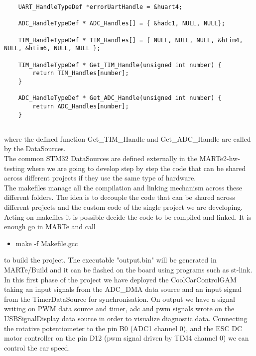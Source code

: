 \begin{lstlisting}
   	UART_HandleTypeDef *errorUartHandle = &huart4;
   	
   	ADC_HandleTypeDef * ADC_Handles[] = { &hadc1, NULL, NULL};
   	
   	TIM_HandleTypeDef * TIM_Handles[] = { NULL, NULL, NULL, &htim4, NULL, &htim6, NULL, NULL };
   	
   	TIM_HandleTypeDef * Get_TIM_Handle(unsigned int number) {
   		return TIM_Handles[number];
   	}
   	
   	ADC_HandleTypeDef * Get_ADC_Handle(unsigned int number) {
   		return ADC_Handles[number];
   	}
   	
\end{lstlisting}
where the defined function Get\_TIM\_Handle and Get\_ADC\_Handle are called by the DataSources.\\
The common STM32 DataSources are defined externally in the MARTe2-hw-testing where we are going to develop step by step the code that can be shared across different projects if they use the same type of hardware.\\
The makefiles manage all the compilation and linking mechanism across these different folders. The idea is to decouple the code that can be shared across different projects and the custom code of the single project we are developing. Acting on makefiles it is possible decide the code to be compiled and linked. It is enough go in MARTe and call
\begin{itemize}
\item make -f Makefile.gcc
\end{itemize}    	
to build the project. The executable "output.bin" will be generated in MARTe/Build and it can be flashed on the board using programs such as st-link.\\
In this first phase of the project we have deployed the CoolCarControlGAM taking an input signals from the ADC\_DMA data source and an input signal from the TimerDataSource for synchronisation. On output we have a signal writing on PWM data source and timer, adc and pwm signals wrote on the USBSignalDisplay data source in order to visualize diagnostic data. Connecting the rotative potentiometer to the pin B0 (ADC1 channel 0), and the ESC DC motor controller on the pin D12 (pwm signal driven by TIM4 channel 0) we can control the car speed. 

